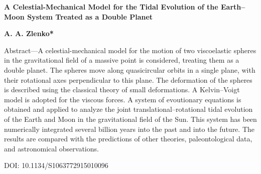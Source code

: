 \documentclass[12pt]{article}
\begin{document}
\thispagestyle{fancy}
\renewcommand{\headrulewidth}{1pt}
\makeatletter
\def\headrule{{\if@fancyplain\let\headrulewidth\plainheadrulewidth\fi
\hrule\@height\headrulewidth\@width\headwidth
\vskip 2pt%
\hrule\@height.5pt\@width\headwidth%
\vskip-\headrulewidth
\vskip-1.5pt}}
\makeatother

\textbf{A Celestial-Mechanical Model for the Tidal Evolution
of the Earth–Moon System Treated as a Double Planet}
\begin{center}
\textbf{A. A. Zlenko*}
\end{center}
\begin{center}
Abstract—A celestial-mechanical model for the motion of two viscoelastic spheres in the gravitational
field of a massive point is considered, treating them as a double planet. The spheres move along quasicircular
orbits in a single plane, with their rotational axes perpendicular to this plane. The deformation of
the spheres is described using the classical theory of small deformations. A Kelvin–Voigt model is adopted
for the viscous forces. A system of evoutionary equations is obtained and applied to analyze the joint
translational–rotational tidal evolution of the Earth and Moon in the gravitational field of the Sun. This
system has been numerically integrated several billion years into the past and into the future. The results
are compared with the predictions of other theories, paleontological data, and astronomical observations.
\end{center}
\begin{center}
DOI: 10.1134/S1063772915010096
\end{center}
\end{document}
